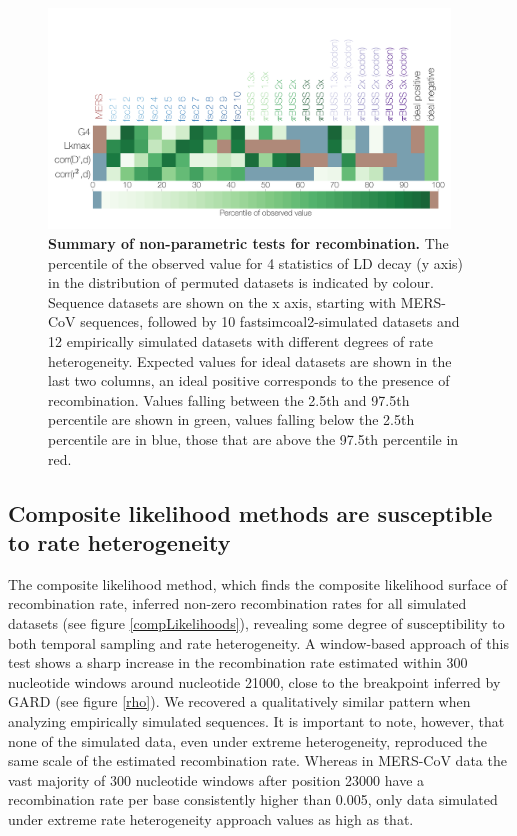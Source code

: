 \documentclass[11pt,oneside,letterpaper]{article}
\begin{document}
\begin{figure}[h]
	\centering
	\includegraphics[width=0.95\textwidth]{figures/MERS_LDhat_permutations_summary.png}
	\caption{\textbf{Summary of non-parametric tests for recombination.}
The percentile of the observed value for 4 statistics of LD decay (y axis) in the distribution of permuted datasets is indicated by colour.
Sequence datasets are shown on the x axis, starting with MERS-CoV sequences, followed by 10 fastsimcoal2-simulated datasets and 12 empirically simulated datasets with different degrees of rate heterogeneity.
Expected values for ideal datasets are shown in the last two columns, an ideal positive corresponds to the presence of recombination.
Values falling between the 2.5th and 97.5th percentile are shown in green, values falling below the 2.5th percentile are in blue, those that are above the 97.5th percentile in red.}
	\label{permutations}
\end{figure}

\subsection*{Composite likelihood methods are susceptible to rate heterogeneity}
The composite likelihood method, which finds the composite likelihood surface of recombination rate, inferred non-zero recombination rates for all simulated datasets (see figure \ref{compLikelihoods}), revealing some degree of susceptibility to both temporal sampling and rate heterogeneity.
A window-based approach of this test shows a sharp increase in the recombination rate estimated within 300 nucleotide windows around nucleotide 21000, close to the breakpoint inferred by GARD (see figure \ref{rho}).
We recovered a qualitatively similar pattern when analyzing empirically simulated sequences.
It is important to note, however, that none of the simulated data, even under extreme heterogeneity, reproduced the same scale of the estimated recombination rate.
Whereas in MERS-CoV data the vast majority of 300 nucleotide windows after position 23000 have a recombination rate per base consistently higher than 0.005, only data simulated under extreme rate heterogeneity approach values as high as that.
\end{document}
